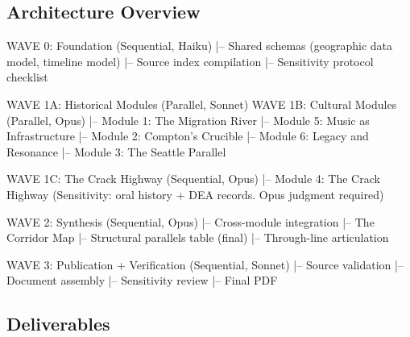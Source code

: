 \documentclass[11pt,letterpaper]{article}
\begin{document}
\subsection{Architecture Overview}

\begin{asciibox}
WAVE 0: Foundation (Sequential, Haiku)
  |-- Shared schemas (geographic data model, timeline model)
  |-- Source index compilation
  |-- Sensitivity protocol checklist

WAVE 1A: Historical Modules (Parallel, Sonnet)          WAVE 1B: Cultural Modules (Parallel, Opus)
  |-- Module 1: The Migration River                        |-- Module 5: Music as Infrastructure
  |-- Module 2: Compton's Crucible                         |-- Module 6: Legacy and Resonance
  |-- Module 3: The Seattle Parallel

WAVE 1C: The Crack Highway (Sequential, Opus)
  |-- Module 4: The Crack Highway
  (Sensitivity: oral history + DEA records. Opus judgment required)

WAVE 2: Synthesis (Sequential, Opus)
  |-- Cross-module integration
  |-- The Corridor Map
  |-- Structural parallels table (final)
  |-- Through-line articulation

WAVE 3: Publication + Verification (Sequential, Sonnet)
  |-- Source validation
  |-- Document assembly
  |-- Sensitivity review
  |-- Final PDF
\end{asciibox}

\subsection{Deliverables}
\end{document}
